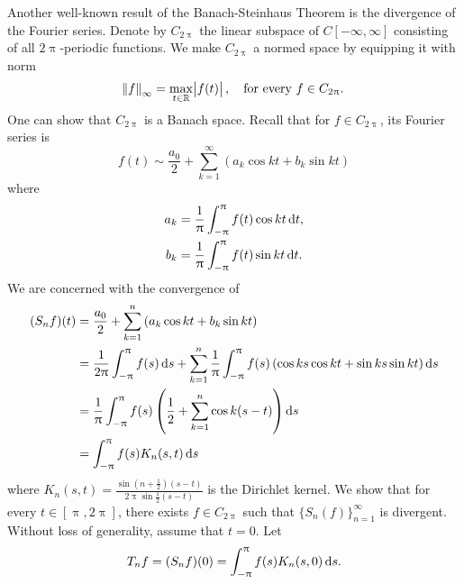 Another well-known result of the Banach-Steinhaus Theorem is the divergence 
of the Fourier series. 
Denote by $C_{2 \uppi}$ the linear subspace of $C[-\infty, \infty]$ consisting 
of all $2\uppi$-periodic functions. 
We make $C_{2 \uppi}$ a normed space by equipping it with norm 
\begin{equation*}
    \norm{f}_\infty = \max_{t \in \mathbb{R}} \abs{f(t)}, \quad 
    \text{for every } f \in C_{2 \uppi}. 
\end{equation*}
One can show that $C_{2 \uppi}$ is a Banach space. 
Recall that for $f \in C_{2 \uppi}$, its Fourier series is 
\begin{equation*}
    f(t) \sim \frac{a_0}{2} + \sum_{k=1}^{\infty} 
        \left( a_k \cos kt + b_k \sin kt \right) 
\end{equation*}
where 
\begin{equation*}
    \begin{aligned}
        a_k &= \frac{1}{\uppi} \int_{-\uppi}^{\uppi} f(t) \cos kt \mathop{}\!\mathrm{d} t, \\ 
        b_k &= \frac{1}{\uppi} \int_{-\uppi}^{\uppi} f(t) \sin kt \mathop{}\!\mathrm{d} t. 
    \end{aligned}
\end{equation*}
We are concerned with the convergence of 
\begin{equation*}
    \begin{aligned}
        (S_nf)(t) &= \frac{a_0}{2} + \sum_{k=1}^{n} 
            \left( a_k \cos kt + b_k \sin kt \right) \\ 
        &= \frac{1}{2 \uppi} \int_{-\uppi}^{\uppi} f(s) \mathop{}\!\mathrm{d} s 
            + \sum_{k=1}^{n} \frac{1}{\uppi} 
            \int_{-\uppi}^{\uppi} f(s) 
                \left( \cos ks \cos kt + \sin ks \sin kt 
                \right) \mathop{}\!\mathrm{d} s \\
        &= \frac{1}{\uppi} \int_{-\uppi}^{\uppi} f(s) \left( \frac{1}{2} 
            + \sum_{k=1}^{n} \cos k(s - t) \right) \mathop{}\!\mathrm{d} s \\ 
        &= \int_{-\uppi}^{\uppi} f(s) K_n(s, t) \mathop{}\!\mathrm{d} s
    \end{aligned}
\end{equation*}
where $K_n(s, t) = \frac{\sin (n + \frac{1}{2}) (s - t)}
{2 \uppi \sin \frac{1}{2}(s - t)}$ is the Dirichlet kernel. 
We show that for every $t \in [\uppi, 2\uppi]$, there exists $f \in C_{2\uppi}$ 
such that $\{ S_n(f) \}_{n=1}^{\infty}$ is divergent. 
Without loss of generality, assume that $t = 0$. 
Let 
\begin{equation*}
    T_n f = (S_n f)(0) = \int_{-\uppi}^{\uppi} f(s) K_n(s, 0) \mathop{}\!\mathrm{d} s. 
\end{equation*}
